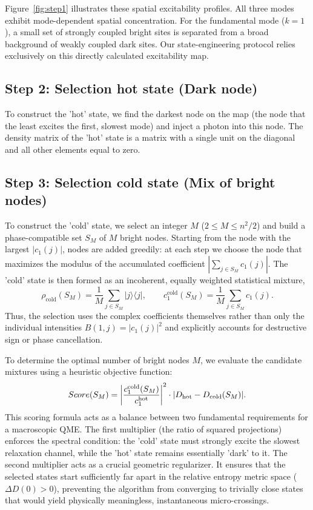 \documentclass[pdflatex,sn-mathphys-num]{sn-jnl}
\begin{document}
Figure~\ref{fig:step1} illustrates these spatial excitability profiles. All three modes exhibit mode-dependent spatial concentration. For the fundamental mode ($k=1$), a small set of strongly coupled bright sites is separated from a broad background of weakly coupled dark sites. Our state-engineering protocol relies exclusively on this directly calculated excitability map.

\subsection{Step 2: Selection hot state (Dark node)}
To construct the 'hot' state, we find the darkest node on the map (the node that the least excites the first, slowest mode) and inject a photon into this node. The density matrix of the 'hot' state is a matrix with a single unit on the diagonal and all other elements equal to zero.

\subsection{Step 3: Selection cold state (Mix of bright nodes)}

To construct the 'cold' state, we select an integer $M$ ($2 \le M \le n^2/2$) and build a phase-compatible set $S_M$ of $M$ bright nodes. Starting from the node with the largest $|c_1(j)|$, nodes are added greedily: at each step we choose the node that maximizes the modulus of the accumulated coefficient $|\sum_{j\in S_M}c_1(j)|$. The 'cold' state is then formed as an incoherent, equally weighted statistical mixture,
\begin{equation}
    \rho_{\mathrm{cold}}(S_M)=\frac{1}{M}\sum_{j\in S_M}|j\rangle\langle j|,
    \qquad
    c_1^{\mathrm{cold}}(S_M)=\frac{1}{M}\sum_{j\in S_M}c_1(j).
    \label{eq:cold_state_selection}
\end{equation}
Thus, the selection uses the complex coefficients themselves rather than only the individual intensities $B(1,j)=|c_1(j)|^2$ and explicitly accounts for destructive sign or phase cancellation.

To determine the optimal number of bright nodes $M$, we evaluate the candidate mixtures using a heuristic objective function:
\begin{equation}
    Score(S_M) = \abs{\frac{c_1^{\mathrm{cold}}(S_M)}{c_1^{\mathrm{hot}}}}^2\cdot\abs{D_{\mathrm{hot}}-D_{\mathrm{cold}}(S_M)}.
    \label{eq:heuristic_score}
\end{equation}
This scoring formula acts as a balance between two fundamental requirements for a macroscopic QME. The first multiplier (the ratio of squared projections) enforces the spectral condition: the 'cold' state must strongly excite the slowest relaxation channel, while the 'hot' state remains essentially 'dark' to it. The second multiplier acts as a crucial geometric regularizer. It ensures that the selected states start sufficiently far apart in the relative entropy metric space ($\Delta D(0) > 0$), preventing the algorithm from converging to trivially close states that would yield physically meaningless, instantaneous micro-crossings.
\end{document}
